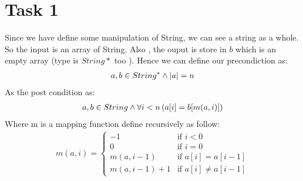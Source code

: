 \documentclass[a4paper,12pt,fleqn]{scrartcl}
\newcommand{\length}[1]{\left|#1\right|}
\begin{document}
\section{Task 1}
Since we have define some manipulation of String, we can see a 
string as a whole. So the input is an array of String. Also ,
the ouput is store in $b$ which is an empty array (type is $String*$ too 
). Hence we can define our precondiction as:
\begin{gather*}
    a,b\in String^*\And\length{a} = n
\end{gather*}
As the post condition as:
\begin{gather*}
    a,b\in String \wedge\forall i < n\left(a[i] = b[m(a,i)]\right)
\end{gather*}
Where m is a mapping function define recursively as follow:
\begin{gather*}
    m(a,i) = 
    \begin{cases}
        -1          & \text{if } i<0\\
        0           & \text{if } i=0\\
        m(a,i-1)    & \text{if } a[i] = a[i-1]\\
        m(a,i-1) +1 & \text{if } a[i] \neq a[i-1]
    \end{cases}
\end{gather*}
\end{document}
